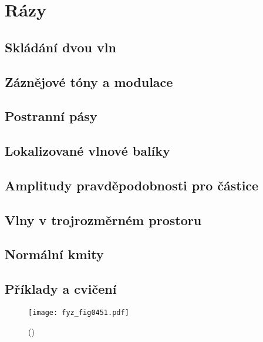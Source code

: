 \setchaptertoc
\chapter{Rázy}\label{fyz:IchapXLVIII}

  \section{Skládání dvou vln}\label{fyz:IchapXLVIIIsecI}
  \section{Záznějové tóny a modulace}\label{fyz:IchapXLVIIIsecII}
  \section{Postranní pásy}\label{fyz:IchapXLVIIIsecIII}
  \section{Lokalizované vlnové balíky}\label{fyz:IchapXLVIIIsecIV}
  \section{Amplitudy pravděpodobnosti pro částice}\label{fyz:IchapXLVIIIsecV}
  \section{Vlny v trojrozměrném prostoru}\label{fyz:IchapXLVIIIsecVI}
  \section{Normální kmity}\label{fyz:IchapXLVIIIsecVII}
  \section{Příklady a cvičení}\label{fyz:IchapXLVIIIsecVIII}

    \begin{figure}[ht!] %
      \centering
      \texttt{[image: fyz\_fig0451.pdf]}
      \caption{ 
               (\cite[s.~707]{Feynman01})}
      \label{fyz:fig0451}
    \end{figure}
    
